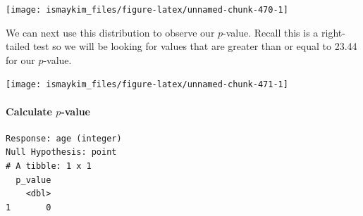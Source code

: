 \documentclass[12pt,]{krantz}
\makeatletter
\newenvironment{Shaded}{\begin{snugshade}}{\end{snugshade}}
\newcommand{\KeywordTok}[1]{\textcolor[rgb]{0.27,0.27,0.27}{\textbf{#1}}}
\newcommand{\DataTypeTok}[1]{\textcolor[rgb]{0.27,0.27,0.27}{#1}}
\newcommand{\StringTok}[1]{\textcolor[rgb]{0.5,0.5,0.5}{#1}}
\newcommand{\OperatorTok}[1]{\textcolor[rgb]{0.43,0.43,0.43}{\textbf{#1}}}
\newcommand{\NormalTok}[1]{#1}
\let\oldparagraph\paragraph
\renewcommand{\paragraph}[1]{\oldparagraph{#1}\mbox{}}
\newenvironment{kframe}{%
\medskip{}
\setlength{\fboxsep}{.8em}
 \def\at@end@of@kframe{}%
 \ifinner\ifhmode%
  \def\at@end@of@kframe{\end{minipage}}%
  \begin{minipage}{\columnwidth}%
 \fi\fi%
 \def\FrameCommand##1{\hskip\@totalleftmargin \hskip-\fboxsep
 \colorbox{shadecolor}{##1}\hskip-\fboxsep
     \hskip-\linewidth \hskip-\@totalleftmargin \hskip\columnwidth}%
 \MakeFramed {\advance\hsize-\width
   \@totalleftmargin\z@ \linewidth\hsize
   \@setminipage}}%
 {\par\unskip\endMakeFramed%
 \at@end@of@kframe}
\renewenvironment{Shaded}{\begin{kframe}}{\end{kframe}}
\theoremstyle{definition}
\theoremstyle{definition}
\theoremstyle{definition}
\theoremstyle{remark}
\makeatother
\begin{document}
\begin{Shaded}
\end{Shaded}

\begin{center}\texttt{[image: ismaykim\_files/figure-latex/unnamed-chunk-470-1]} \end{center}

We can next use this distribution to observe our \(p\)-value. Recall
this is a right-tailed test so we will be looking for values that are
greater than or equal to 23.44 for our \(p\)-value.

\begin{Shaded}
\end{Shaded}

\begin{center}\texttt{[image: ismaykim\_files/figure-latex/unnamed-chunk-471-1]} \end{center}

\paragraph{\texorpdfstring{Calculate
\(p\)-value}{Calculate p-value}}\label{calculate-p-value}

\begin{Shaded}
\end{Shaded}

\begin{verbatim}
Response: age (integer)
Null Hypothesis: point
# A tibble: 1 x 1
  p_value
    <dbl>
1       0
\end{verbatim}
\end{document}
